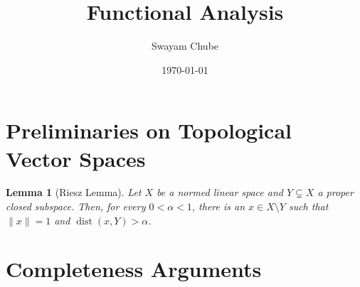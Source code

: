 \documentclass[11pt]{article}
\title{Functional Analysis}
\author{Swayam Chube}
\date{\today}
\theoremstyle{thmstyle}
\newtheorem{lemma}[theorem]{Lemma}
\theoremstyle{defstyle}
\begin{document}
\maketitle
\tableofcontents

\newpage

\section{Preliminaries on Topological Vector Spaces}

\begin{lemma}[Riesz Lemma]
    Let $X$ be a normed linear space and $Y\subsetneq X$ a proper closed subspace. Then, for every $0 < \alpha < 1$, there is an $x\in X\setminus Y$ such that $\|x\| = 1$ and $\operatorname{dist}(x, Y) > \alpha$.
\end{lemma}

\section{Completeness Arguments}
\end{document}
